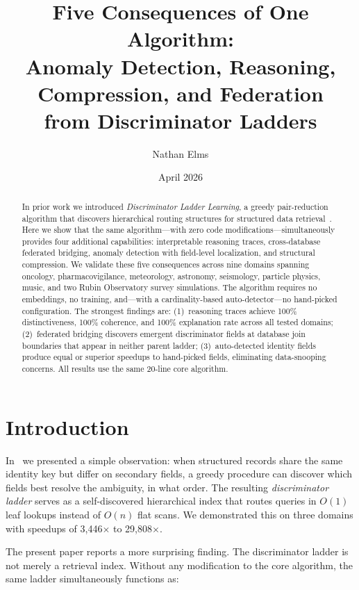\documentclass[11pt]{article}
\title{Five Consequences of One Algorithm:\\Anomaly Detection, Reasoning, Compression, and Federation\\from Discriminator Ladders}
\author{Nathan Elms}
\affil{Independent Researcher}
\date{April 2026}
\begin{document}
\maketitle

\begin{abstract}
In prior work we introduced \textit{Discriminator Ladder Learning}, a greedy pair-reduction algorithm that discovers hierarchical routing structures for structured data retrieval~\cite{elms2026dw}. Here we show that the same algorithm---with zero code modifications---simultaneously provides four additional capabilities: interpretable reasoning traces, cross-database federated bridging, anomaly detection with field-level localization, and structural compression. We validate these five consequences across nine domains spanning oncology, pharmacovigilance, meteorology, astronomy, seismology, particle physics, music, and two Rubin Observatory survey simulations. The algorithm requires no embeddings, no training, and---with a cardinality-based auto-detector---no hand-picked configuration. The strongest findings are: (1)~reasoning traces achieve 100\% distinctiveness, 100\% coherence, and 100\% explanation rate across all tested domains; (2)~federated bridging discovers emergent discriminator fields at database join boundaries that appear in neither parent ladder; (3)~auto-detected identity fields produce equal or superior speedups to hand-picked fields, eliminating data-snooping concerns. All results use the same 20-line core algorithm.
\end{abstract}

\section{Introduction}

In~\cite{elms2026dw} we presented a simple observation: when structured records share the same identity key but differ on secondary fields, a greedy procedure can discover which fields best resolve the ambiguity, in what order. The resulting \textit{discriminator ladder} serves as a self-discovered hierarchical index that routes queries in $O(1)$ leaf lookups instead of $O(n)$ flat scans. We demonstrated this on three domains with speedups of 3{,}446$\times$ to 29{,}808$\times$.

The present paper reports a more surprising finding. The discriminator ladder is not merely a retrieval index. Without any modification to the core algorithm, the same ladder simultaneously functions as:
\end{document}
